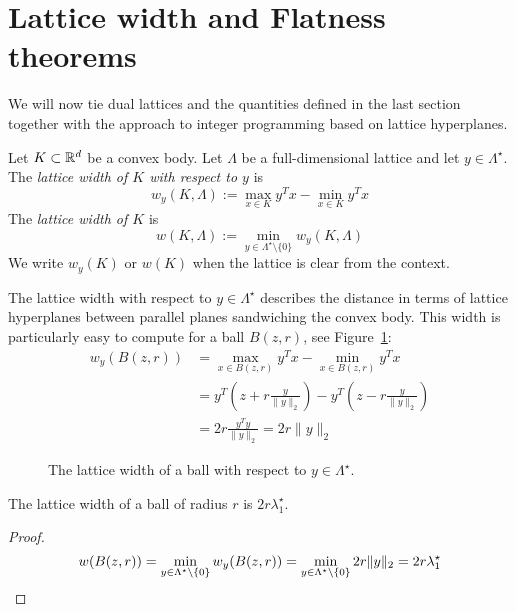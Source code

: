 \section{Lattice width and Flatness theorems}

We will now tie dual lattices and the quantities defined in the last section
together with the approach to integer programming based on lattice hyperplanes.

\begin{definition}
  Let $K \subset \mathbb{R}^d$ be a convex body.
  Let $\Lambda$ be a full-dimensional lattice and let $y \in \Lambda^\star$.
  The \emph{lattice width of $K$ with respect to $y$} is
  \[
    w_y(K, \Lambda) := \max_{x \in K} y^T x - \min_{x \in K} y^T x
  \]
  The \emph{lattice width of $K$} is
  \[
    w(K, \Lambda) := \min_{y \in \Lambda^\star \setminus \{0\} } w_y(K,\Lambda)
  \]
  We write $w_y(K)$ or $w(K)$ when the lattice is clear from the context.
\end{definition}

The lattice width with respect to $y \in \Lambda^\star$
describes the distance in terms of lattice hyperplanes between parallel planes
sandwiching the convex body.
This width is particularly easy to compute for a ball $B(z,r)$,
see Figure~\ref{fig:lattice-width-ball}:
\begin{align*}
  w_y(B(z,r)) &= \max_{x \in B(z,r)} y^Tx - \min_{x \in B(z,r)} y^Tx \\
   &= y^T (z + r \frac{y}{\|y\|_2}) - y^T (z - r \frac{y}{\|y\|_2}) \\
   &= 2r \frac{y^T y}{\|y\|_2} = 2r \|y\|_2
\end{align*}
\begin{figure}
  \begin{center}
  \end{center}
  \caption{The lattice width of a ball with respect to $y \in \Lambda^\star$.}
  \label{fig:lattice-width-ball}
\end{figure}

\begin{lemma}
  The lattice width of a ball of radius $r$ is $2r\lambda_1^\star$.
\end{lemma}
\begin{proof}
  \[
    w(B(z,r)) = \min_{y \in \Lambda^\star \setminus \{0\} } w_y(B(z,r))
      = \min_{y \in \Lambda^\star \setminus \{0\} } 2r \|y\|_2 = 2r \lambda_1^\star
    \qedhere
  \]
\end{proof}

